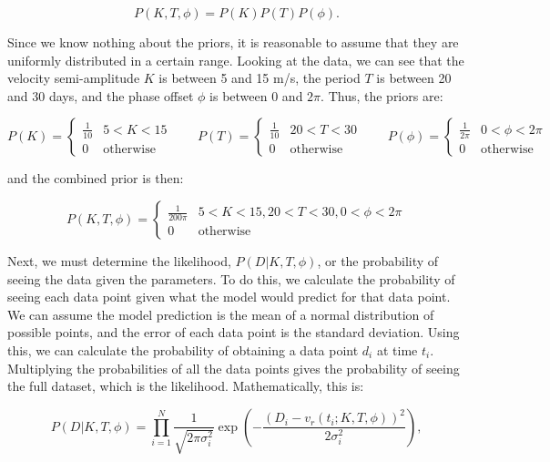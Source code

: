 \documentclass[preprint,longauthor]{aastex631}
\numberwithin{equation}{section}
\begin{document}
\begin{equation}
  P(K,T,\phi) = P(K)P(T)P(\phi).
\end{equation}

Since we know nothing about the priors, it is reasonable to assume that they are uniformly distributed in a certain range. Looking at the data, we can see that the velocity semi-amplitude $K$ is between 5 and 15 m/s, the period $T$ is between 20 and 30 days, and the phase offset $\phi$ is between 0 and $2\pi$. Thus, the priors are:

\begin{equation*}
  P(K) = \begin{cases}
    \frac{1}{10} & 5 < K < 15 \\
    0 & \text{otherwise}
  \end{cases} \qquad
  P(T) = \begin{cases}
    \frac{1}{10} & 20 < T < 30 \\
    0 & \text{otherwise}
  \end{cases} \qquad
  P(\phi) = \begin{cases}
    \frac{1}{2\pi} & 0 < \phi < 2\pi \\
    0 & \text{otherwise}
  \end{cases}
\end{equation*}

and the combined prior is then:

\begin{equation}
  P(K,T,\phi) = \begin{cases}
    \frac{1}{200\pi} & 5 < K < 15, 20 < T < 30, 0 < \phi < 2\pi \\
    0 & \text{otherwise}
  \end{cases}
\end{equation}

Next, we must determine the likelihood, $P(D|K,T,\phi)$, or the probability of seeing the data given the parameters. To do this, we calculate the probability of seeing each data point given what the model would predict for that data point. We can assume the model prediction is the mean of a normal distribution of possible points, and the error of each data point is the standard deviation. Using this, we can calculate the probability of obtaining a data point $d_i$ at time $t_i$. Multiplying the probabilities of all the data points gives the probability of seeing the full dataset, which is the likelihood. Mathematically, this is:

\begin{equation}
  P(D|K,T,\phi) = \prod_{i=1}^{N} \frac{1}{\sqrt{2\pi\sigma_i^2}} \exp\left(-\frac{(D_i - v_r(t_i;K,T,\phi))^2}{2\sigma_i^2}\right),
\end{equation}
\end{document}
